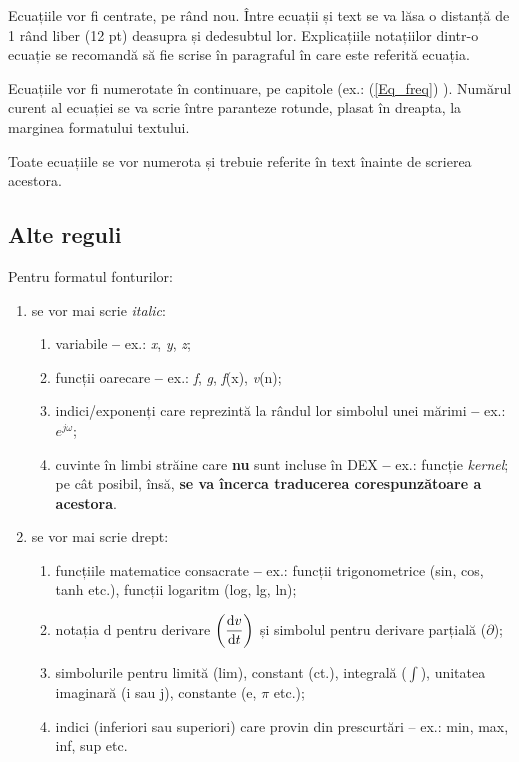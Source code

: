 Ecuațiile vor fi centrate, pe rând nou. Între ecuații și text se va lăsa o distanță de 1 rând liber (12 pt) deasupra și dedesubtul lor. Explicațiile notațiilor dintr-o ecuație se recomandă să fie scrise în paragraful în care este referită ecuația.

Ecuațiile vor fi numerotate în continuare, pe capitole (ex.: (\ref{Eq_freq}) ). Numărul curent al ecuației se va scrie între paranteze rotunde, plasat în dreapta, la marginea formatului textului.

Toate ecuațiile se vor numerota și trebuie referite în text înainte de scrierea acestora.

\subsection{Alte reguli}

	Pentru formatul fonturilor:
 \begin{enumerate}
     \item se vor mai scrie \textit{italic}:
     \begin{enumerate}
         \item variabile \textbf{--} ex.: \textit{x}, \textit{y}, \textit{z};
         \item funcții oarecare \textbf{--} ex.: \textit{f}, \textit{g}, \textit{f}(x), \textit{v}(n);
         \item indici/exponenți care reprezintă la rândul lor simbolul unei mărimi \textbf{--} ex.: $e^{j\omega}$;
         \item cuvinte în limbi străine care \textbf{nu} sunt incluse în DEX \textbf{--} ex.: funcție \textit{kernel}; pe cât posibil, însă, \textbf{se va încerca traducerea corespunzătoare a acestora}.\\
     \end{enumerate} 
     \item se vor mai scrie drept:
     \begin{enumerate}
         \item funcțiile matematice consacrate \textbf{--} ex.: funcții trigonometrice (sin, cos, tanh etc.), funcții logaritm (log, lg, ln);
	\item notația d pentru derivare  \( \displaystyle \left( \frac{\textnormal{d}v}{\textnormal{d}t} \right) \) și simbolul pentru derivare parțială ($\partial$);
	\item simbolurile pentru limită (lim), constant (ct.), integrală ($\int$), unitatea imaginară (i sau j), constante (e, $\pi$ etc.);
	\item indici (inferiori sau superiori) care provin din prescurtări – ex.: min, max, inf, sup etc.\\
     \end{enumerate}
 \end{enumerate}

